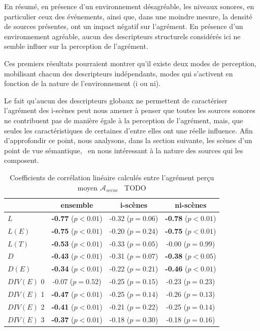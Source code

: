 En résumé, en présence d'un environnement désagréable, les niveaux sonores, en particulier ceux des événements, ainsi que, dans une moindre mesure, la densité de sources présentes, ont un impact négatif sur l'agrément. En présence d'un environnement agréable, aucun des descripteurs structurels considérés ici ne semble influer sur la perception de l'agrément. 

Ces premiers résultats pourraient montrer qu'il existe deux modes de perception, mobilisant chacun des descripteurs indépendants, modes qui s'activent en fonction de la nature de l'environnement (i ou ni).

Le fait qu'aucun des descripteurs globaux ne permettent de caractériser l'agrément des i-scènes peut nous amener à penser que toutes les sources sonores ne contribuent pas de manière égale à la perception de l'agrément, mais, que seules les caractéristiques de certaines d'entre elles ont une réelle influence. Afin d'approfondir ce point, nous analysons, dans la section suivante, les scènes d'un point de vue sémantique, \ie~en nous intéressant à la nature des sources qui les composent. \\


\begin{table}[t]
\centering
\begin{tabular}{l c c c} 
            & ensemble                     & i-scènes                   & ni-scènes    \\
\hline
$L$            & \textbf{-0.77} ($p<0.01$)    & -0.32 ($p=0.06$)           & \textbf{-0.78} ($p<0.01$)\\
$L(E)$         & \textbf{-0.75} ($p<0.01$)    & -0.20 ($p=0.24$)           & \textbf{-0.75} ($p<0.01$)\\
$L(T)$         & \textbf{-0.53} ($p<0.01$)    & -0.33 ($p=0.05$)           &  -0.00 ($p=0.99$) \\
$D$            & \textbf{-0.43} ($p<0.01$)    & -0.31 ($p=0.07$)           & \textbf{-0.38} ($p<0.05$)\\
$D(E)$         & \textbf{-0.34} ($p<0.01$)    & -0.22 ($p=0.21$)           & \textbf{-0.46} ($p<0.01$)\\
$DIV(E)$ 0     &          -0.07 ($p=0.52$)    & -0.25 ($p=0.15$)           & -0.23 ($p=0.23$)\\
$DIV(E)$ 1     & \textbf{-0.47} ($p<0.01$)    & -0.25 ($p=0.14$)           & -0.26 ($p=0.13$)\\
$DIV(E)$ 2     & \textbf{-0.41} ($p<0.01$)    & -0.21 ($p=0.22$)           & -0.25 ($p=0.14$)\\
$DIV(E)$ 3     & \textbf{-0.37} ($p<0.01$)    & -0.18 ($p=0.30$)           & -0.18 ($p=0.16$)\\
\hline
\end{tabular}
\vspace{0.5mm}
\caption{Coefficients de corrélation linéaire calculés entre l'agrément perçu moyen $\mathcal{A}_{scene}$ \vs~TODO}
\label{tab:corrStructA}
\end{table}

